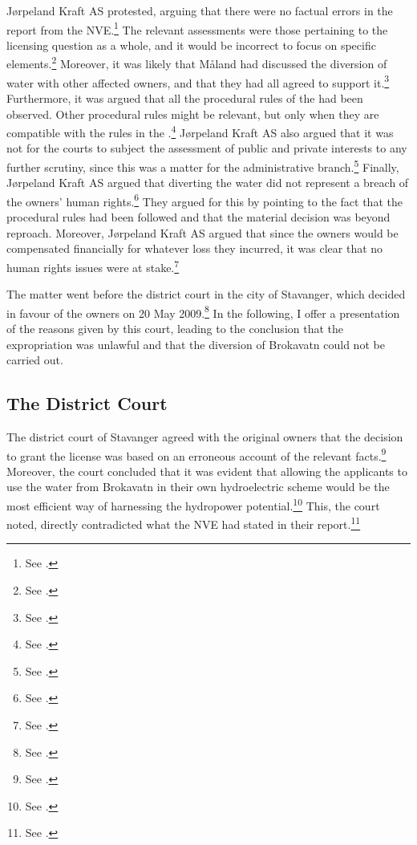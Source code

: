 Jørpeland Kraft AS protested, arguing that there were no factual errors in the report from the NVE.\footnote{See \cite[16]{jorpeland11}.} The relevant assessments were those pertaining to the licensing question as a whole, and it would be incorrect to focus on specific elements.\footnote{See \cite[2]{jorpeland11a)}.} Moreover, it was likely that Måland had discussed the diversion of water with other affected owners, and that they had all agreed to support it.\footnote{See \cite[2]{jorpeland11a}.} Furthermore, it was argued that all the procedural rules of the \cite{wra17} had been observed. Other procedural rules might be relevant, but only when they are compatible with the rules in the \cite{wra17}.\footnote{See \cite[16]{jorpeland11}.} Jørpeland Kraft AS also argued that it was not for the courts to subject the assessment of public and private interests to any further scrutiny, since this was a matter for the administrative branch.\footnote{See \cite[2]{jorpeland11a}.} Finally, Jørpeland Kraft AS argued that diverting the water did not represent a breach of the owners' human rights.\footnote{See \cite[2]{jorpeland11a}.} They argued for this by pointing to the fact that the procedural rules had been followed and that the material decision was beyond reproach. Moreover, Jørpeland Kraft AS argued that since the owners would be compensated financially for whatever loss they incurred, it was clear that no human rights issues were at stake.\footnote{See \cite[2]{jorpeland11a}.}

The matter went before the district court in the city of Stavanger, which decided in favour of the owners on 20 May 2009.\footnote{See \cite{jorpeland09}.} In the following, I offer a presentation of the reasons given by this court, leading to the conclusion that the expropriation was unlawful and that the diversion of Brokavatn could not be carried out.

\subsection{The District Court}

The district court of Stavanger agreed with the original owners that the decision to grant the license was based on an erroneous account of the relevant facts.\footnote{See \cite[25]{jorpeland11}.} Moreover, the court concluded that it was evident that allowing the applicants to use the water from Brokavatn in their own hydroelectric scheme would be the most efficient way of harnessing the hydropower potential.\footnote{See \cite[22-23]{jorpeland09}.} This, the court noted, directly contradicted what the NVE had stated in their report.\footnote{See \cite[23]{jorpeland09}.}

